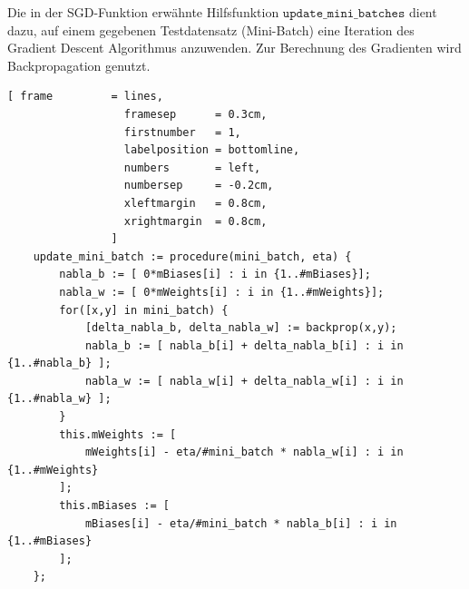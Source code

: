 \noindent
Die in der SGD-Funktion erwähnte Hilfsfunktion $\mathtt{update\_mini\_batches}$ dient dazu, auf einem gegebenen Testdatensatz (Mini-Batch) eine Iteration des Gradient Descent Algorithmus anzuwenden. Zur Berechnung des Gradienten wird Backpropagation genutzt.
\begin{Verbatim}[ frame         = lines, 
                  framesep      = 0.3cm, 
                  firstnumber   = 1,
                  labelposition = bottomline,
                  numbers       = left,
                  numbersep     = -0.2cm,
                  xleftmargin   = 0.8cm,
                  xrightmargin  = 0.8cm,
                ]
    update_mini_batch := procedure(mini_batch, eta) {
        nabla_b := [ 0*mBiases[i] : i in {1..#mBiases}];
        nabla_w := [ 0*mWeights[i] : i in {1..#mWeights}];
        for([x,y] in mini_batch) {
            [delta_nabla_b, delta_nabla_w] := backprop(x,y);
            nabla_b := [ nabla_b[i] + delta_nabla_b[i] : i in {1..#nabla_b} ];
            nabla_w := [ nabla_w[i] + delta_nabla_w[i] : i in {1..#nabla_w} ];
        }
        this.mWeights := [ 
            mWeights[i] - eta/#mini_batch * nabla_w[i] : i in {1..#mWeights} 
        ];
        this.mBiases := [ 
            mBiases[i] - eta/#mini_batch * nabla_b[i] : i in {1..#mBiases} 
        ];
    };
\end{Verbatim}
